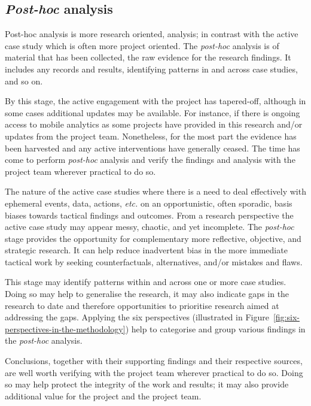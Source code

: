\subsection{\emph{Post-hoc} analysis}
Post-hoc analysis is more research oriented, analysis; in contrast with the active case study which is often more project oriented. The \emph{post-hoc} analysis is of material that has been collected, the raw evidence for the research findings. It includes any records and results, identifying patterns in and across case studies, and so on.

By this stage, the active engagement with the project has tapered-off, although in some cases additional updates may be available. For instance, if there is ongoing access to mobile analytics as some projects have provided in this research and/or updates from the project team. Nonetheless, for the most part the evidence has been harvested and any active interventions have generally ceased. The time has come to perform \emph{post-hoc} analysis and verify the findings and analysis with the project team wherever practical to do so. 

The nature of the active case studies where there is a need to deal effectively with ephemeral events, data, actions, \textit{etc.} on an opportunistic, often sporadic, basis biases towards tactical findings and outcomes. From a research perspective the active case study may appear messy, chaotic, and yet incomplete. 
The \textit{post-hoc} stage provides the opportunity for complementary more reflective, objective, and strategic research. It can help reduce inadvertent bias in the more immediate tactical work by seeking counterfactuals, alternatives, and/or mistakes and flaws.


This stage may identify patterns within and across one or more case studies. Doing so may help to generalise the research, it may also indicate gaps in the research to date and therefore opportunities to prioritise research aimed at addressing the gaps. Applying the six perspectives (illustrated in Figure~\ref{fig:six-perspectives-in-the-methodology}) help to categorise and group various findings in the \textit{post-hoc} analysis. 

Conclusions, together with their supporting findings and their respective sources, are well worth verifying with the project team wherever practical to do so. Doing so may help protect the integrity of the work and results; it may also provide additional value for the project and the project team. 


